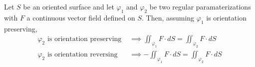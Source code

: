   \begin{theorem}
    \label{thm:invariance-vector-surface-integrals-under}
		Let $S$ be an oriented surface and let $\varphi_1$ and $\varphi_2$ be two regular paramaterizations with $F$ a continuous vector field defined on $S$. Then, assuming $\varphi_1$ is orientation preserving, 
		\begin{align}
			\varphi_2 \text{ is orientation preserving } & \implies \iint_{\varphi_1} F \cdot d S = \iint_{\varphi_2} F \cdot d S \\
			\varphi_2 \text{ is orientation reversing } & \implies - \iint_{\varphi_1} F \cdot d S = \iint_{\varphi_2} F \cdot d S 
		\end{align}
  \end{theorem}
		
